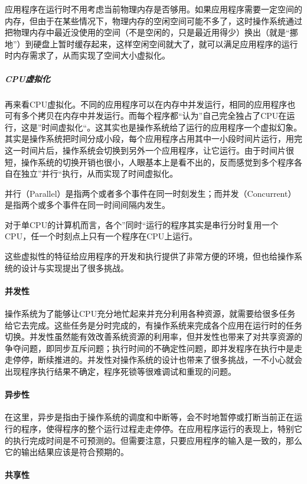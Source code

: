 应用程序在运行时不用考虑当前物理内存是否够用。如果应用程序需要一定空间的内存，但由于在某些情况下，物理内存的空闲空间可能不多了，这时操作系统通过把物理内存中最近没使用的空间（不是空闲的，只是最近用得少）换出（就是“挪地”）到硬盘上暂时缓存起来，这样空闲空间就大了，就可以满足应用程序的运行时内存需求了，从而实现了空间大小虚拟化。

\subparagraph{CPU虚拟化}

再来看CPU虚拟化。不同的应用程序可以在内存中并发运行，相同的应用程序也可有多个拷贝在内存中并发运行。而每个程序都“认为”自己完全独占了CPU在运行，这是”时间虚拟化“。这其实也是操作系统给了运行的应用程序一个虚拟幻象。其实是操作系统把时间分成小段，每个应用程序占用其中一小段时间片运行，用完这一时间片后，操作系统会切换到另外一个应用程序，让它运行。由于时间片很短，操作系统的切换开销也很小，人眼基本上是看不出的，反而感觉到多个程序各自在独立”并行“执行，从而实现了时间虚拟化。

并行（Parallel）是指两个或者多个事件在同一时刻发生；而并发（Concurrent）是指两个或多个事件在同一时间间隔内发生。  

对于单CPU的计算机而言，各个”同时“运行的程序其实是串行分时复用一个CPU，任一个时刻点上只有一个程序在CPU上运行。  

    这些虚拟性的特征给应用程序的开发和执行提供了非常方便的环境，但也给操作系统的设计与实现提出了很多挑战。

\paragraph{并发性}

操作系统为了能够让CPU充分地忙起来并充分利用各种资源，就需要给很多任务给它去完成。这些任务是分时完成的，有操作系统来完成各个应用在运行时的任务切换。并发性虽然能有效改善系统资源的利用率，但并发性也带来了对共享资源的争夺问题，即同步互斥问题；执行时间的不确定性问题，即并发程序在执行中是走走停停，断续推进的。并发性对操作系统的设计也带来了很多挑战，一不小心就会出现程序执行结果不确定，程序死锁等很难调试和重现的问题。

\paragraph{异步性}

在这里，异步是指由于操作系统的调度和中断等，会不时地暂停或打断当前正在运行的程序，使得程序的整个运行过程走走停停。在应用程序运行的表现上，特别它的执行完成时间是不可预测的。但需要注意，只要应用程序的输入是一致的，那么它的输出结果应该是符合预期的。

\paragraph{共享性}

